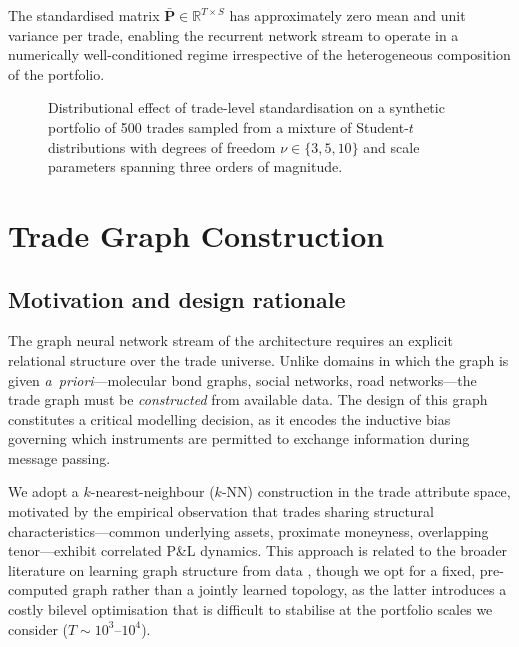\documentclass[11pt,a4paper]{article}
\newcommand{\R}{\mathbb{R}}
\newcommand{\bP}{\bm{P}}
\begin{document}
The standardised matrix $\bar{\bP} \in \R^{T \times S}$ has approximately
zero mean and unit variance per trade, enabling the recurrent network stream
to operate in a numerically well-conditioned regime irrespective of the
heterogeneous composition of the portfolio.

\begin{figure}[t]
  \centering
  \caption{%
    Distributional effect of trade-level standardisation on a synthetic
    portfolio of 500 trades sampled from a mixture of Student-$t$
    distributions with degrees of freedom $\nu \in \{3,5,10\}$ and scale
    parameters spanning three orders of magnitude.%
  }
  \label{fig:standardisation}
\end{figure}


\section{Trade Graph Construction}\label{sec:graph}

\subsection{Motivation and design rationale}\label{sec:graph:motivation}

The graph neural network stream of the architecture requires an explicit
relational structure over the trade universe.  Unlike domains in which the
graph is given \emph{a~priori}---molecular bond graphs, social networks, road
networks---the trade graph must be \emph{constructed} from available data.  The
design of this graph constitutes a critical modelling decision, as it
encodes the inductive bias governing which instruments are permitted to
exchange information during message passing.

We adopt a $k$-nearest-neighbour ($k$-NN) construction in the trade attribute
space, motivated by the empirical observation that trades sharing structural
characteristics---common underlying assets, proximate moneyness, overlapping
tenor---exhibit correlated P\&L dynamics.  This approach is related to the
broader literature on learning graph structure from data
\cite{kipf2018neural,franceschi2019learning}, though we opt for a fixed,
pre-computed graph rather than a jointly learned topology, as the latter
introduces a costly bilevel optimisation that is difficult to stabilise at the
portfolio scales we consider ($T \sim 10^3$--$10^4$).
\end{document}
